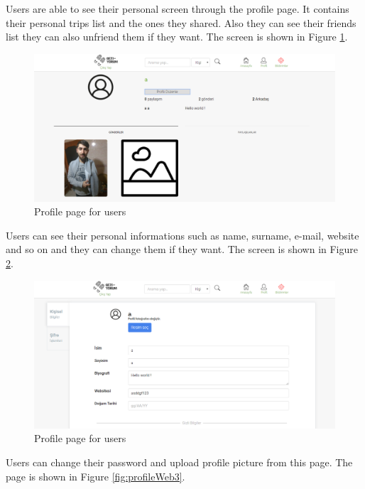 \newpage

Users are able to see their personal screen through the profile page. It contains their personal trips list and the ones they shared. Also they can see their friends list they can also unfriend them if they want. The screen is shown in Figure  \ref{fig:profileWeb1}.

\begin{figure}[!htbp]
\centering
\includegraphics[width=\textwidth]{projectChapters/images/profileWeb1.png}
\caption{Profile page for users}
\label{fig:profileWeb1}
\end{figure}

\newpage

Users can see their personal informations such as name, surname, e-mail, website and so on and they can change them if they want. The screen is shown in Figure  \ref{fig:profileWeb2}.

\begin{figure}[!htbp]
\centering
\includegraphics[width=\textwidth]{projectChapters/images/profileWeb2.png}
\caption{Profile page for users}
\label{fig:profileWeb2}
\end{figure}

\newpage

Users can change their password and upload profile picture from this page. The page is shown in Figure  \ref{fig:profileWeb3}.

